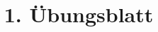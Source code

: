 


\title{1. Übungsblatt}



\maketitle
\thispagestyle{empty}
\newpage

\printbibliography




%



